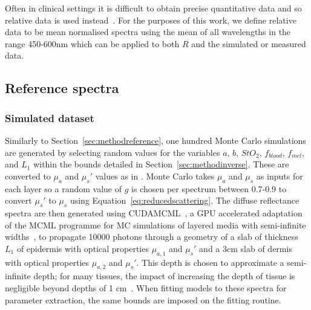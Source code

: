 Often in clinical settings it is difficult to obtain precise quantitative data and so relative data is used instead~\citep{Bahl2023}. For the
purposes of this work, we define relative data to be mean normalised spectra using the mean of all wavelengths in the range 450-600nm which can be applied to both $R$ and the simulated or measured data. 
%

\subsection{Reference spectra}\label{sec:methodreference2}
\subsubsection{Simulated dataset}
Similarly to Section~\ref{sec:methodreference}, one hundred
Monte Carlo simulations are generated by selecting random values for the variables $a$, $b$, $StO_2$, $f_{blood}$, $f_{mel}$, and $L_1$ within the bounds detailed in Section~\ref{sec:methodinverse}.
These are converted to $\mu_a$ and $\mu_s'$ values as in . Monte Carlo takes $\mu_a$ and $\mu_s$ as inputs for each layer so a random value of $g$ is chosen per spectrum between 0.7-0.9 to convert $\mu_s'$ to $\mu_s$ using Equation~\eqref{eq:reducedscattering}. The diffuse reflectance spectra are then generated using CUDAMCML~\citep{Alerstam2008}, a GPU accelerated adaptation of the MCML programme for MC simulations of layered media with semi-infinite widths~\citep{Wang1995, Prahl1989}, to propagate 10000 photons through a geometry of a slab of thickness $L_1$ of epidermis with optical properties $\mu_{a,1}$ and $\mu_s'$ and a 3cm slab of dermis with optical properties $\mu_{a, 2}$ and $\mu_s'$. This depth is chosen to approximate a semi-infinite depth; for many tissues, the impact of increasing the depth of tissue is negligible beyond depths of 1 cm~\citep{Zhang2014}. When fitting models to these spectra for parameter extraction, the same bounds are imposed on the fitting routine. 

